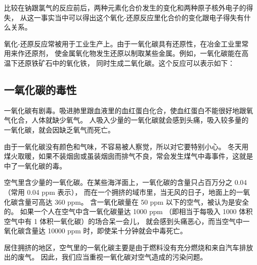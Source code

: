 \taolun 比较在钠跟氯气的反应前后，两种元素化合价发生的变化和两种原子核外电子的得失，
从这一事实当中可以得出这个氧化-还原反应里化合价的变化跟电子得失有什么关系。

氧化-还原反应常被用于工业生产上。由于一氧化碳具有还原性，在冶金工业里常用来作还原剂，
使金属氧化物发生还原以制取某些金属。例如，一氧化碳能在高温下还原铁矿石中的氧化铁，
同时生成二氧化碳。这个反应可以表示如下：
\begin{fangchengshi}
\end{fangchengshi}


\subsection{一氧化碳的毒性}

一氧化碳有剧毒。吸进肺里跟血液里的血红蛋白化合，使血红蛋白不能很好地跟氧气化合，人体就缺少氧气。
人吸入少量的一氧化碳就会感到头痛，吸入较多量的一氧化碳，就会因缺乏氧气而死亡。

由于一氧化碳没有颜色和气味，不容易被人察觉，所以对它要特别小心。
冬天用煤火取暖，如果不装烟囱或虽装烟囱而排气不良，常会发生煤气中毒事件，这就是中了一氧化碳的毒。

\begin{yuedu}
    空气里含少量的一氧化碳。在某些海洋面上，一氧化碳的含量只占百万分之 0.04 （常用 0.04 ppm 表示），
    而在一个拥挤的域市里，当无风的日子，地面上的一氧化碳含量可高达 360 ppm。
    含一氧化碳量在 50 ppm 以下的空气，被认为是安全的。
    如果一个人在空气中含一氧化碳量达 1000 ppm （即相当于每吸入 1000 体积空气中有 1 体积一氧化碳）的场合呆一会儿，
    就会感到头痛恶心，而当空气中一氧化碳含量达 10000 ppm 时，即使呆十分钟就会中毒死亡。

    居住拥挤的地区，空气里的一氧化碳主要是由于燃料没有充分燃烧和来自汽车排放出的废气。
    因此，我们应当重视一氧化碳对空气造成的污染问题。
\end{yuedu}


